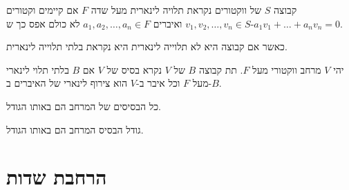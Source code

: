 \documentclass{tstextbook}
\begin{document}
\begin{definition}
קבוצה \(S\) של ווקטורים נקראת תלויה לינארית מעל שדה \(F\) אם קיימים וקטורים \(v_{1},v_{2},\dots,v_{n}\in S\) ואיברים \(a_{1},a_{2},\dots,a_{n}\in F\) לא כולם אפס כך ש-\(a_{1}v_{1}+\dots+a_{n}v_{n}=0\). 

\end{definition}
כאשר אם קבוצה היא לא תלוייה לינארית היא נקראת בלתי תלוייה לינארית.

\begin{definition}[בסיס]
יהי \(V\) מרחב ווקטורי מעל \(F\). תת קבוצה \(B\) של \(V\) נקרא בסיס של \(V\) אם \(B\) בלתי תלוי לינארי מעל \(F\) וכל איבר ב-\(V\) הוא צירוף לינארי של האיברים ב-\(B\).

\end{definition}
\begin{proposition}
כל הבסיסים של המרחב הם באותו הגודל.

\end{proposition}
\begin{definition}
גודל הבסיס המרחב הם באותו הגודל.

\end{definition}
\section{הרחבת שדות}
\end{document}
